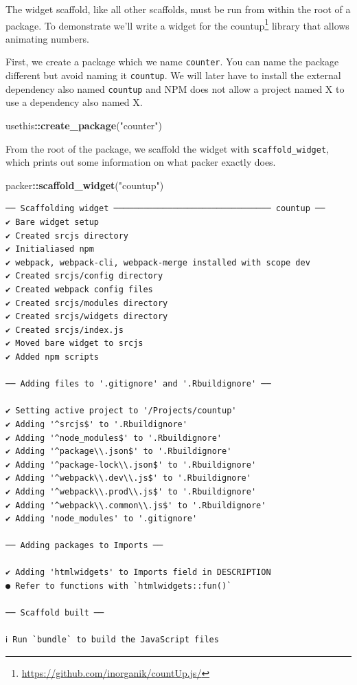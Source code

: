 \documentclass[
]{krantz}
\makeatletter
\newenvironment{Shaded}{\begin{snugshade}}{\end{snugshade}}
\newcommand{\KeywordTok}[1]{\textcolor[rgb]{0.27,0.27,0.27}{\textbf{#1}}}
\newcommand{\NormalTok}[1]{#1}
\newcommand{\OperatorTok}[1]{\textcolor[rgb]{0.43,0.43,0.43}{\textbf{#1}}}
\newcommand{\StringTok}[1]{\textcolor[rgb]{0.5,0.5,0.5}{#1}}
\renewcommand{\href}[2]{#2\footnote{\url{#1}}}
\newenvironment{kframe}{%
\medskip{}
\setlength{\fboxsep}{.8em}
 \def\at@end@of@kframe{}%
 \ifinner\ifhmode%
  \def\at@end@of@kframe{\end{minipage}}%
  \begin{minipage}{\columnwidth}%
 \fi\fi%
 \def\FrameCommand##1{\hskip\@totalleftmargin \hskip-\fboxsep
 \colorbox{shadecolor}{##1}\hskip-\fboxsep
     \hskip-\linewidth \hskip-\@totalleftmargin \hskip\columnwidth}%
 \MakeFramed {\advance\hsize-\width
   \@totalleftmargin\z@ \linewidth\hsize
   \@setminipage}}%
 {\par\unskip\endMakeFramed%
 \at@end@of@kframe}
\renewenvironment{Shaded}{\begin{kframe}}{\end{kframe}}
\makeatother
\begin{document}
The widget scaffold, like all other scaffolds, must be run from within the root of a package. To demonstrate we'll write a widget for the \href{https://github.com/inorganik/countUp.js/}{countup} library that allows animating numbers.

First, we create a package which we name \texttt{counter}. You can name the package different but avoid naming it \texttt{countup}. We will later have to install the external dependency also named \texttt{countup} and NPM does not allow a project named X to use a dependency also named X.

\begin{Shaded}
\begin{Highlighting}[]
\NormalTok{usethis}\OperatorTok{::}\KeywordTok{create\_package}\NormalTok{(}\StringTok{"counter"}\NormalTok{)}
\end{Highlighting}
\end{Shaded}

From the root of the package, we scaffold the widget with \texttt{scaffold\_widget}, which prints out some information on what packer exactly does.

\begin{Shaded}
\begin{Highlighting}[]
\NormalTok{packer}\OperatorTok{::}\KeywordTok{scaffold\_widget}\NormalTok{(}\StringTok{"countup"}\NormalTok{)}
\end{Highlighting}
\end{Shaded}

\begin{verbatim}
── Scaffolding widget ──────────────────────────────── countup ── 
✔ Bare widget setup
✔ Created srcjs directory
✔ Initialiased npm
✔ webpack, webpack-cli, webpack-merge installed with scope dev
✔ Created srcjs/config directory
✔ Created webpack config files
✔ Created srcjs/modules directory
✔ Created srcjs/widgets directory
✔ Created srcjs/index.js
✔ Moved bare widget to srcjs
✔ Added npm scripts

── Adding files to '.gitignore' and '.Rbuildignore' ──

✔ Setting active project to '/Projects/countup'
✔ Adding '^srcjs$' to '.Rbuildignore'
✔ Adding '^node_modules$' to '.Rbuildignore'
✔ Adding '^package\\.json$' to '.Rbuildignore'
✔ Adding '^package-lock\\.json$' to '.Rbuildignore'
✔ Adding '^webpack\\.dev\\.js$' to '.Rbuildignore'
✔ Adding '^webpack\\.prod\\.js$' to '.Rbuildignore'
✔ Adding '^webpack\\.common\\.js$' to '.Rbuildignore'
✔ Adding 'node_modules' to '.gitignore'

── Adding packages to Imports ──

✔ Adding 'htmlwidgets' to Imports field in DESCRIPTION
● Refer to functions with `htmlwidgets::fun()`

── Scaffold built ──

ℹ Run `bundle` to build the JavaScript files
\end{verbatim}
\end{document}
